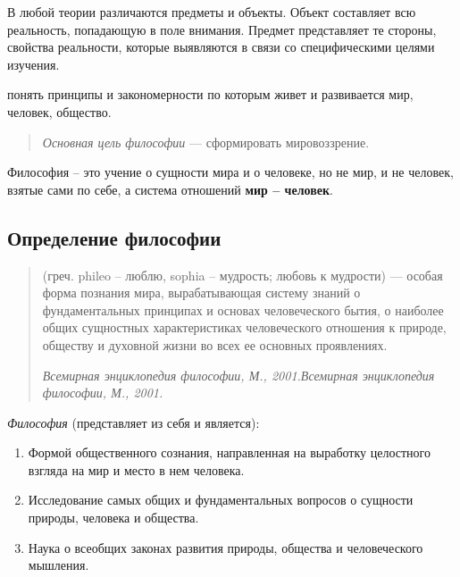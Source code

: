\documentclass[
]{article}
\providecommand{\tightlist}{%
  \setlength{\itemsep}{0pt}\setlength{\parskip}{0pt}}
\begin{document}
В любой теории различаются предметы и объекты. Объект составляет всю
реальность, попадающую в поле внимания. Предмет представляет те стороны,
свойства реальности, которые выявляются в связи со специфическими целями
изучения.

\begin{description}
\tightlist
\item[\emph{Цель философии} ---]
понять принципы и закономерности по которым живет и развивается мир,
человек, общество.
\end{description}

\begin{quote}
\emph{Основная цель философии} --- сформировать мировоззрение.
\end{quote}

Философия -- это учение о сущности мира и о человеке, но не мир, и не
человек, взятые сами по себе, а система отношений \textbf{мир --
человек}.

\hypertarget{ux43eux43fux440ux435ux434ux435ux43bux435ux43dux438ux435-ux444ux438ux43bux43eux441ux43eux444ux438ux438}{%
\subsection{Определение
философии}\label{ux43eux43fux440ux435ux434ux435ux43bux435ux43dux438ux435-ux444ux438ux43bux43eux441ux43eux444ux438ux438}}

\begin{quote}
\begin{description}
\tightlist
\item[\emph{ФИЛОСОФИЯ} ---]
(греч. phileo -- люблю, sophia -- мудрость; любовь к мудрости) ---
особая форма познания мира, вырабатывающая систему знаний о
фундаментальных принципах и основах человеческого бытия, о наиболее
общих сущностных характеристиках человеческого отношения к природе,
обществу и духовной жизни во всех ее основных проявлениях.
\end{description}

\emph{Всемирная энциклопедия философии, М., 2001.Всемирная энциклопедия
философии, М., 2001.}
\end{quote}

\emph{Философия} (представляет из себя и является):

\begin{enumerate}
\def\labelenumi{\arabic{enumi}.}
\tightlist
\item
  Формой общественного сознания, направленная на выработку целостного
  взгляда на мир и место в нем человека.
\item
  Исследование самых общих и фундаментальных вопросов о сущности
  природы, человека и общества.
\item
  Наука о всеобщих законах развития природы, общества и человеческого
  мышления.
\end{enumerate}
\end{document}
